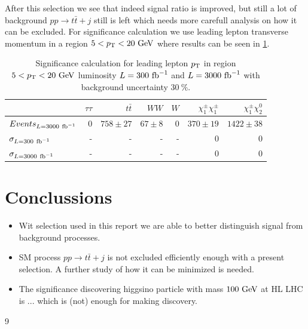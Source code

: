\documentclass[tightenline,notitlepage,nofootinbib]{revtex4-1}
\begin{document}
After this selection we see that indeed signal ratio is improved, but still a lot of background $pp \to t \bar t + j$ still is left which needs more carefull analysis on how it can be excluded. For significance calculation we use leading lepton transverse momentum in a region $5<p_{\rm T}<20~\rm{GeV}$ where results can be seen in \cref{tab:select}.
\begin{table}[!ht]
  \setlength{\tabcolsep}{12pt}
  \centering
  \begin{tabular}{l|rrrrrr}
    & $\tau \tau$ & $t \bar t$ & $WW$ & $W$ & $\chi_1^{\pm} \chi_1^{\pm}$ &  $\chi_1^{\pm} \chi_2^0$ \\
    \hline
    $Events_{L=3000~\rm{fb}^{-1}}$  & 0 & $758 \pm 27$ & $67 \pm 8$ & 0 & $370 \pm 19$ & $1422 \pm 38$ \\
    $\sigma_{L=300~\rm{fb}^{-1}}$ & - & - & - & - & 0 & 0 \\
    $\sigma_{L=3000~\rm{fb}^{-1}}$ & - & - & - & - & 0 & 0 
  \end{tabular}
  \caption{Significance calculation for leading lepton $p_{\rm T}$ in region $5<p_{\rm T}<20~\rm{GeV}$ luminosity $L=300~\rm{fb}^{-1}$ and $L=3000~\rm{fb}^{-1}$ with background uncertainty $30~\%$.
  }
  \label{tab:select}
\end{table}

\section{Conclussions}

\begin{itemize}
\item Wit selection used in this report we are able to better distinguish signal from background processes.  
\item SM process $pp \to t \bar t + j$ is not excluded efficiently enough with a present selection. A further study of how it can be minimized is needed. 
\item The significance discovering higgsino particle with mass $100~\rm{GeV}$ at HL LHC is ... which is (not) enough for making discovery. 
\end{itemize}

%
{9}
%
  
\end{document}
